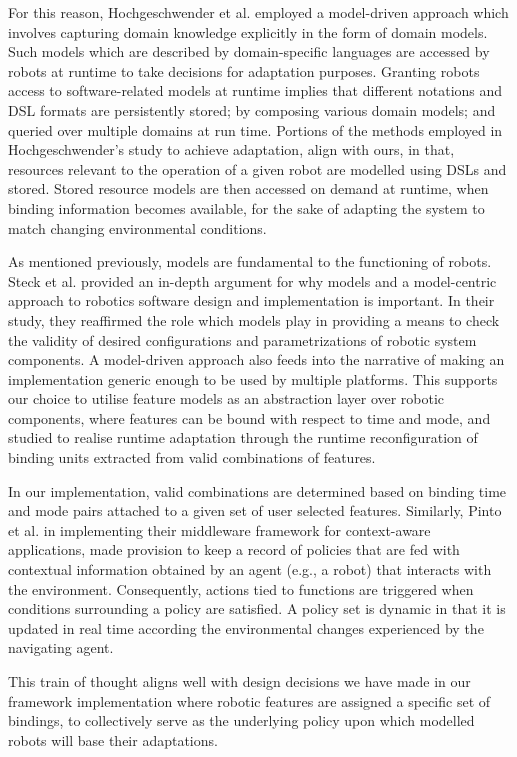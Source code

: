 \documentclass[conference]{IEEEtran}
\begin{document}
For this reason, Hochgeschwender et al. \cite{graph-mde} employed a model-driven approach which involves capturing domain knowledge explicitly in the form of domain models. Such models which are described by domain-specific languages are accessed by robots at runtime to take decisions for adaptation purposes. Granting robots access to software-related models at runtime implies that different notations and DSL formats are persistently stored; by composing various domain models; and queried over multiple domains at run time. Portions of the methods employed in Hochgeschwender's study to achieve adaptation, align with ours, in that, resources relevant to the operation of a given robot are modelled using DSLs and stored. Stored resource models are then accessed on demand at runtime, when binding information becomes available, for the sake of adapting the system to match changing environmental conditions.

As mentioned previously, models are fundamental to the functioning of robots. Steck et al. \cite{model-centric} provided an in-depth argument for why models and a model-centric approach to robotics software design and implementation is important.
In their study, they reaffirmed the role which models play in providing a means to check the validity of desired configurations and parametrizations of robotic system components. A model-driven approach also feeds into the narrative of making an implementation generic enough to be used by multiple platforms. This supports our choice to utilise feature models as an abstraction layer over robotic components, where features can be bound with respect to time and mode, and studied to realise runtime adaptation through the runtime reconfiguration of binding units extracted from valid combinations of features.

In our implementation, valid combinations are determined based on binding time and mode pairs attached to a given set of user selected features. Similarly, Pinto et al. \cite{cont-aware} in implementing their middleware framework for context-aware applications, made provision to keep a record of policies that are fed with contextual information obtained by an agent (e.g., a robot) that interacts with the environment. Consequently, actions tied to functions are triggered when conditions surrounding a policy are satisfied. A policy set is dynamic in that it is updated in real time according the environmental changes experienced by the navigating agent.
 
This train of thought aligns well with design decisions we have made in our framework implementation where robotic features are assigned a specific set of bindings, to collectively serve as the underlying policy upon which modelled robots will base their adaptations.
 
\end{document}
